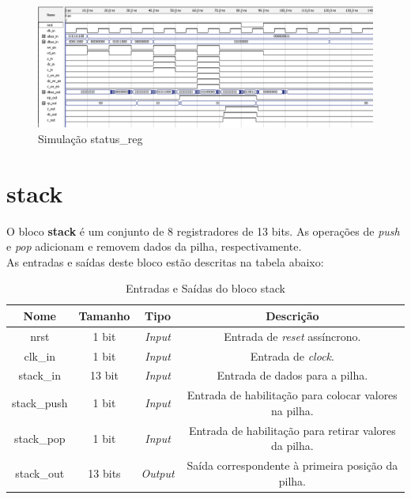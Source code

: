 \documentclass{article}
\begin{document}
\begin{figure}[ht]
    \begin{center}
        \includegraphics[width=15cm]{images/status.png}
        \caption{Simulação status\_reg}
\end{center}
\end{figure}

\newpage

\section{stack}

O bloco \textbf{stack} é um conjunto de 8 registradores de 13 bits. As operações de \textit{push} e \textit{pop} adicionam e removem dados da pilha, respectivamente.\\

As entradas e saídas deste bloco estão descritas na tabela abaixo:\\

\begin{table}[ht]
    \begin{center}
        \begin{tabular}{|c|c|c|c|}
            \hline
            Nome & Tamanho & Tipo & Descrição\\
            \hline
            nrst & 1 bit & \textit{Input} & Entrada de \textit{reset} assíncrono.\\
            \hline
            clk\_in & 1 bit & \textit{Input} & Entrada de \textit{clock}.\\
            \hline
            stack\_in & 13 bit & \textit{Input} & Entrada de dados para a pilha.\\
            \hline
            stack\_push & 1 bit & \textit{Input} & Entrada de habilitação para colocar valores na pilha.\\
            \hline
            stack\_pop & 1 bit & \textit{Input} & Entrada de habilitação para retirar valores da pilha.\\
            \hline
            stack\_out & 13 bits & \textit{Output} & Saída correspondente à primeira posição da pilha.\\
            \hline
        \end{tabular}
    \end{center}
    \caption{Entradas e Saídas do bloco stack}
\end{table}
\end{document}
